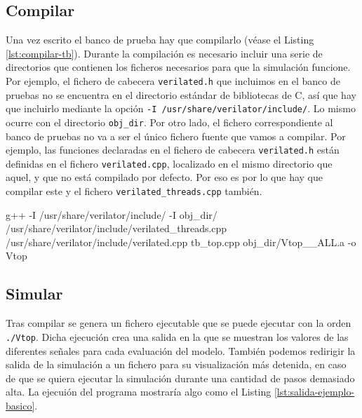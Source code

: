 

\subsection{Compilar}
Una vez escrito el banco de prueba hay que compilarlo (véase el Listing \ref{lst:compilar-tb}). Durante la compilación es necesario incluir una serie de directorios que contienen los ficheros necesarios para que la simulación funcione. Por ejemplo, el fichero de cabecera \verb|verilated.h| que incluimos en el banco de pruebas no se encuentra en el directorio estándar de bibliotecas de C, así que hay que incluirlo mediante la opción \linebreak\verb|-I /usr/share/verilator/include/|. Lo mismo ocurre con el directorio \verb|obj_dir|. Por otro lado, el fichero correspondiente al banco de pruebas no va a ser el único fichero fuente que vamos a compilar. Por ejemplo, las funciones declaradas en el fichero de cabecera \verb|verilated.h| están definidas en el fichero \verb|verilated.cpp|, localizado en el mismo directorio que aquel, y que no está compilado por defecto. Por eso es por lo que hay que compilar este y el fichero \verb|verilated_threads.cpp| también.

\begin{mycode}[style=bashstyle, label=lst:compilar-tb, caption={Compilación del banco de pruebas.}]
g++ -I /usr/share/verilator/include/ -I obj_dir/ /usr/share/verilator/include/verilated_threads.cpp /usr/share/verilator/include/verilated.cpp tb_top.cpp obj_dir/Vtop__ALL.a -o Vtop
\end{mycode}

\subsection{Simular}
Tras compilar se genera un fichero ejecutable que se puede ejecutar con la orden \verb|./Vtop|. Dicha ejecución crea una salida en la que se muestran los valores de las diferentes señales para cada evaluación del modelo. También podemos redirigir la salida de la simulación a un fichero para su visualización más detenida, en caso de que se quiera ejecutar la simulación durante una cantidad de pasos demasiado alta. La ejecuión del programa mostraría algo como el Listing \ref{lst:salida-ejemplo-basico}.

